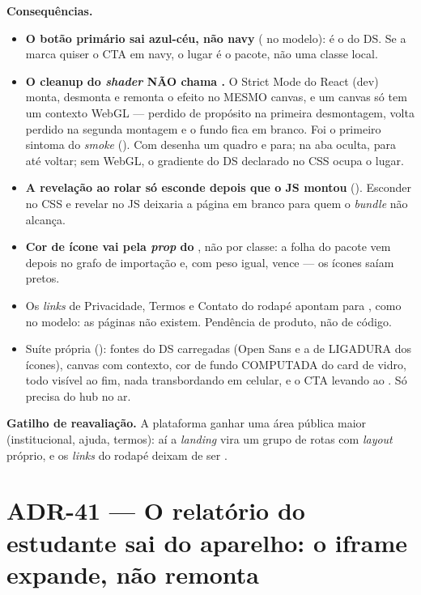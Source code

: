 \textbf{Consequências.}
\begin{itemize}
  \item \textbf{O botão primário sai azul-céu, não navy} ( no
    modelo): é o  do DS. Se a marca quiser o CTA em navy, o lugar é o
    pacote, não uma classe local.
  \item \textbf{O cleanup do \emph{shader} NÃO chama .} O
    Strict Mode do React (dev) monta, desmonta e remonta o efeito no MESMO
    canvas, e um canvas só tem um contexto WebGL --- perdido de propósito na
    primeira desmontagem, volta perdido na segunda montagem e o fundo fica em
    branco. Foi o primeiro sintoma do \emph{smoke}
    (). Com  desenha um quadro
    e para; na aba oculta, para até voltar; sem WebGL, o gradiente do DS
    declarado no CSS ocupa o lugar.
  \item \textbf{A revelação ao rolar só esconde depois que o JS montou}
    (). Esconder no CSS e revelar no JS deixaria a página
    em branco para quem o \emph{bundle} não alcança.
  \item \textbf{Cor de ícone vai pela \emph{prop}  do }, não
    por classe: a folha do pacote vem depois no grafo de importação e, com peso
    igual, vence --- os ícones saíam pretos.
  \item Os \emph{links} de Privacidade, Termos e Contato do rodapé apontam para
    \cd{\#}, como no modelo: as páginas não existem. Pendência de produto, não
    de código.
  \item Suíte própria (): fontes do
    DS carregadas (Open Sans e a de LIGADURA dos ícones), canvas com contexto,
    cor de fundo COMPUTADA do card de vidro, todo  visível
    ao fim, nada transbordando em celular, e o CTA levando ao . Só
    precisa do hub no ar.
\end{itemize}

\textbf{Gatilho de reavaliação.} A plataforma ganhar uma área pública maior
(institucional, ajuda, termos): aí a \emph{landing} vira um grupo de rotas
 com \emph{layout} próprio, e os \emph{links} do rodapé deixam de
ser \cd{\#}.

\section{ADR-41 --- O relatório do estudante sai do aparelho: o iframe expande, não remonta}
\label{adr:relatorio-expandido}

